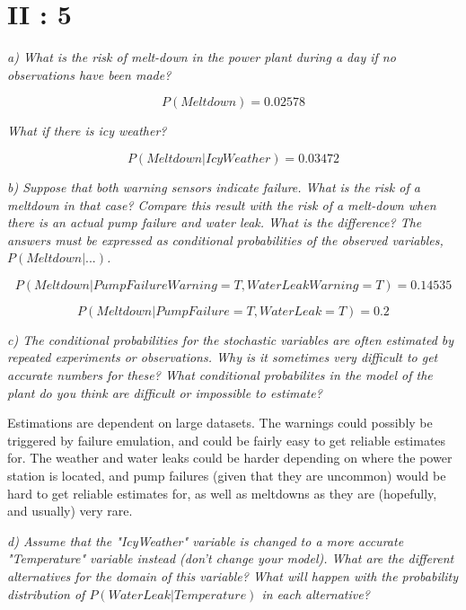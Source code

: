 \section{II : 5}
\begin{framed}\em a) What is the risk of melt-down in the power plant during a day if no observations have been made? \em\end{framed}

$$P(Meltdown) = 0.02578$$

\begin{framed}\em What if there is icy weather?\em\end{framed}

$$P(Meltdown|IcyWeather) = 0.03472$$

\begin{framed}\em b) Suppose that both warning sensors indicate failure. What is the risk of a meltdown in that case? Compare this result with the risk of a melt-down when there is an actual pump failure and water leak. What is the difference? The answers must be expressed as conditional probabilities of the observed variables, $P(Meltdown|...)$.\em\end{framed}

$$P(Meltdown|PumpFailureWarning=T,WaterLeakWarning=T) = 0.14535$$

$$P(Meltdown|PumpFailure=T,WaterLeak=T) = 0.2$$

\begin{framed}\em c) The conditional probabilities for the stochastic variables are often estimated by repeated experiments or observations. Why is it sometimes very difficult to get accurate numbers for these? What conditional probabilites in the model of the plant do you think are difficult or impossible to estimate?\em\end{framed}

Estimations are dependent on large datasets. The warnings could possibly be triggered by failure emulation, and could be fairly easy to get reliable estimates for. The weather and water leaks could be harder depending on where the power station is located, and pump failures (given that they are uncommon) would be hard to get reliable estimates for, as well as meltdowns as they are (hopefully, and usually) very rare.

\begin{framed}\em d) Assume that the "IcyWeather" variable is changed to a more accurate "Temperature" variable instead (don't change your model). What are the different alternatives for the domain of this variable? What will happen with the probability distribution of $P(WaterLeak|Temperature)$ in each alternative? \em\end{framed}


